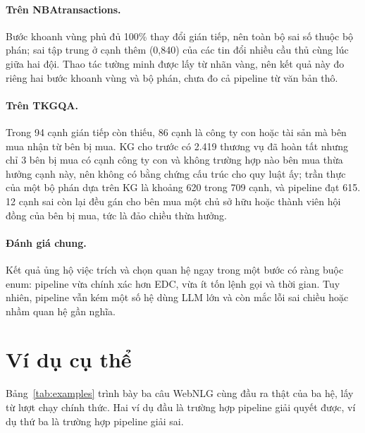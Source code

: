 \paragraph*{Trên NBAtransactions.}
Bước khoanh vùng phủ đủ 100\% thay đổi gián tiếp, nên toàn bộ sai số thuộc bộ phán; sai tập trung ở cạnh thêm (0,840) của các tin đổi nhiều cầu thủ cùng lúc giữa hai đội.
Thao tác tường minh được lấy từ nhãn vàng, nên kết quả này đo riêng hai bước khoanh vùng và bộ phán, chưa đo cả pipeline từ văn bản thô.

\paragraph*{Trên TKGQA.}
Trong 94 cạnh gián tiếp còn thiếu, 86 cạnh là công ty con hoặc tài sản mà bên mua nhận từ bên bị mua.
KG cho trước có 2.419 thương vụ đã hoàn tất nhưng chỉ 3 bên bị mua có cạnh công ty con và không trường hợp nào bên mua thừa hưởng cạnh này, nên không có bằng chứng cấu trúc cho quy luật ấy; trần thực của một bộ phán dựa trên KG là khoảng 620 trong 709 cạnh, và pipeline đạt 615.
12 cạnh sai còn lại đều gán cho bên mua một chủ sở hữu hoặc thành viên hội đồng của bên bị mua, tức là đảo chiều thừa hưởng.

\paragraph*{Đánh giá chung.}
Kết quả ủng hộ việc trích và chọn quan hệ ngay trong một bước có ràng buộc enum: pipeline vừa chính xác hơn EDC, vừa ít tốn lệnh gọi và thời gian. Tuy nhiên, pipeline vẫn kém một số hệ dùng LLM lớn và còn mắc lỗi sai chiều hoặc nhầm quan hệ gần nghĩa.

\section{Ví dụ cụ thể}\label{sec:exp-example}

Bảng~\ref{tab:examples} trình bày ba câu WebNLG cùng đầu ra thật của ba hệ, lấy từ lượt chạy chính thức.
Hai ví dụ đầu là trường hợp pipeline giải quyết được, ví dụ thứ ba là trường hợp pipeline giải sai.

